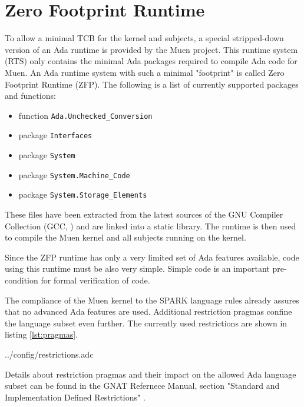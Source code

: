 \section{Zero Footprint Runtime}\label{sec:zfs-rts} To allow a minimal TCB for
the kernel and subjects, a special stripped-down version of an Ada
runtime is provided by the Muen project. This runtime system
(RTS) only contains the minimal Ada packages required to compile Ada
code for Muen. An Ada runtime system with such a minimal "footprint" is called
Zero Footprint Runtime (ZFP). The following is a list of currently
supported packages and functions:

\begin{itemize}
	\item function \texttt{Ada.Unchecked\_Conversion}
	\item package \texttt{Interfaces}
	\item package \texttt{System}
	\item package \texttt{System.Machine\_Code}
	\item package \texttt{System.Storage\_Elements}
\end{itemize}

These files have been extracted from the latest sources of the GNU Compiler
Collection (GCC, \cite{gcc}) and are linked into a static library.
The runtime is then used to compile the Muen kernel and all subjects running on
the kernel.

Since the ZFP runtime has only a very limited set of Ada features available,
code using this runtime must be also very simple. Simple code is an important
pre-condition for formal verification of code.

The compliance of the Muen kernel to the SPARK language rules
already assures that no advanced Ada features are used. Additional restriction
pragmas confine the language subset even further. The currently
used restrictions are shown in listing \ref{lst:pragmas}.


	{../config/restrictions.adc}

Details about restriction pragmas and their impact on the allowed Ada language
subset can be found in the GNAT Refernece Manual, section "Standard and
Implementation Defined Restrictions" \cite{GNAT:manual}.
